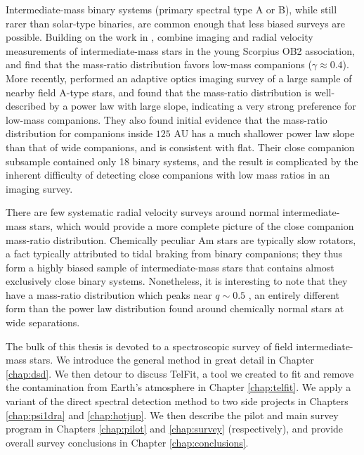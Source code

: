 \documentclass{utthesis}
\begin{document}
Intermediate-mass binary systems (primary spectral type A or B), while still rarer than solar-type binaries, are common enough that less biased surveys are possible. Building on the work in \citet{Shatsky2002}, \citet{Kouwenhoven2007} combine imaging and radial velocity measurements of intermediate-mass stars in the young Scorpius OB2 association, and find that the mass-ratio distribution favors low-mass companions ($\gamma \approx 0.4$). More recently, \citet{DeRosa2014} performed an adaptive optics imaging survey of a large sample of nearby field A-type stars, and found that the mass-ratio distribution is well-described by a power law with large slope, indicating a very strong preference for low-mass companions. They also found initial evidence that the mass-ratio distribution for companions inside $125$ AU has a much shallower power law slope than that of wide companions, and is consistent with flat. Their close companion subsample contained only 18 binary systems, and the result is complicated by the inherent difficulty of detecting close companions with low mass ratios in an imaging survey. 

There are few systematic radial velocity surveys around normal intermediate-mass stars, which would provide a more complete picture of the close companion mass-ratio distribution. Chemically peculiar Am stars are typically slow rotators, a fact typically attributed to tidal braking from binary companions; they thus form a highly biased sample of intermediate-mass stars that contains almost exclusively close binary systems. Nonetheless, it is interesting to note that they have a mass-ratio distribution which peaks near $q \sim 0.5$ \citep{Vuissoz2004}, an entirely different form than the power law distribution found around chemically normal stars at wide separations.

The bulk of this thesis is devoted to a spectroscopic survey of field intermediate-mass stars. We introduce the general method in great detail in Chapter \ref{chap:dsd}. We then detour to discuss TelFit, a tool we created to fit and remove the contamination from Earth's atmosphere in Chapter \ref{chap:telfit}. We apply a variant of the direct spectral detection method to two side projects in Chapters \ref{chap:psi1dra} and \ref{chap:hotjup}. We then describe the pilot and main survey program in Chapters \ref{chap:pilot} and \ref{chap:survey} (respectively), and provide overall survey conclusions in Chapter \ref{chap:conclusions}.


\end{document}
